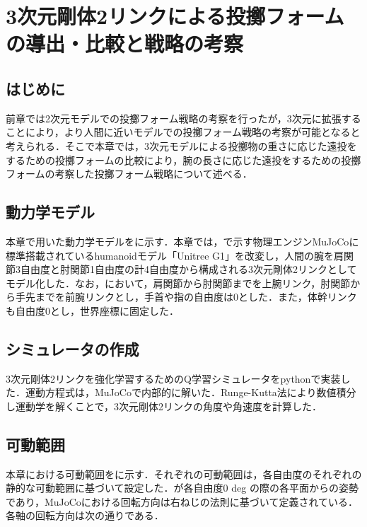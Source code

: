 
\chapter[3次元剛体2リンクによる投擲フォームの導出・比較と戦略の考察]{3次元剛体2リンクによる投擲フォームの導出・比較と戦略の考察}

\section{はじめに}
前章では2次元モデルでの投擲フォーム戦略の考察を行ったが，3次元に拡張することにより，より人間に近いモデルでの投擲フォーム戦略の考察が可能となると考えられる．そこで本章では，3次元モデルによる投擲物の重さに応じた遠投をするための投擲フォームの比較により，腕の長さに応じた遠投をするための投擲フォームの考察した投擲フォーム戦略について述べる．
\section{動力学モデル}
本章で用いた動力学モデルをに示す．本章では，で示す物理エンジンMuJoCo\cite{mujoco}\cite{mujoco2}に標準搭載されているhumanoidモデル「Unitree G1」\cite{unitreeg1}を改変し，人間の腕を肩関節3自由度と肘関節1自由度の計4自由度から構成される3次元剛体2リンクとしてモデル化した．なお，において，肩関節から肘関節までを上腕リンク，肘関節から手先までを前腕リンクとし，手首や指の自由度は0とした．また，体幹リンクも自由度0とし，世界座標に固定した．


\section{シミュレータの作成}
3次元剛体2リンクを強化学習するためのQ学習シミュレータをpythonで実装した．運動方程式は，MuJoCoで内部的に解いた．Runge-Kutta法により数値積分し運動学を解くことで，3次元剛体2リンクの角度や角速度を計算した．
\section{可動範囲}
本章における可動範囲をに示す．それぞれの可動範囲は，各自由度のそれぞれの静的な可動範囲\cite{range}に基づいて設定した．が各自由度0 deg の際の各平面からの姿勢であり，MuJoCoにおける回転方向は右ねじの法則に基づいて定義されている．各軸の回転方向は次の通りである．

